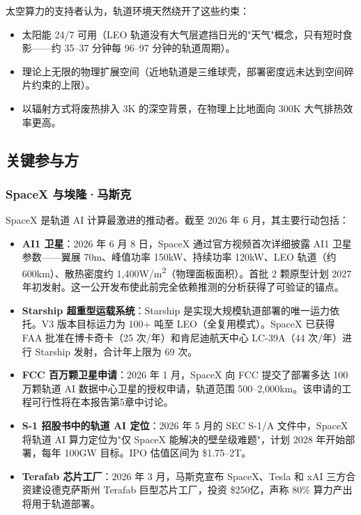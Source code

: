 太空算力的支持者认为，轨道环境天然绕开了这些约束：
\begin{itemize}[leftmargin=*]
    \item 太阳能 24/7 可用（LEO 轨道没有大气层遮挡日光的"天气"概念，只有短时食影——约 35--37 分钟每 96--97 分钟的轨道周期）。
    \item 理论上无限的物理扩展空间（近地轨道是三维球壳，部署密度远未达到空间碎片约束的上限）。
    \item 以辐射方式将废热排入 3\;K 的深空背景，在物理上比地面向 300\;K 大气排热效率更高。
\end{itemize}

\subsection{关键参与方}

\subsubsection{SpaceX 与埃隆·马斯克}

SpaceX 是轨道 AI 计算最激进的推动者。截至 2026 年 6 月，其主要行动包括：

\begin{itemize}[leftmargin=*]
    \item \textbf{AI1 卫星}：2026 年 6 月 8 日，SpaceX 通过官方视频首次详细披露 AI1 卫星参数——翼展 70\;m、峰值功率 150\;kW、持续功率 120\;kW、LEO 轨道（约 600\;km）、散热密度约 1,400\;W/m\textsuperscript{2}（物理面板面积）。首批 2 颗原型计划 2027 年初发射。这一公开发布使此前完全依赖推测的分析获得了可验证的锚点\cite{spacex2026ai1}。
    \item \textbf{Starship 超重型运载系统}：Starship 是实现大规模轨道部署的唯一运力依托。V3 版本目标运力为 100+ 吨至 LEO（全复用模式）。SpaceX 已获得 FAA 批准在博卡奇卡（25 次/年）和肯尼迪航天中心 LC-39A（44 次/年）进行 Starship 发射，合计年上限为 69 次\cite{faa2025boca,faa2026ksc}。
    \item \textbf{FCC 百万颗卫星申请}：2026 年 1 月，SpaceX 向 FCC 提交了部署多达 100 万颗轨道 AI 数据中心卫星的授权申请，轨道范围 500--2,000\;km。该申请的工程可行性将在本报告第5章中讨论\cite{spacex2026fcc}。
    \item \textbf{S-1 招股书中的轨道 AI 定位}：2026 年 5 月的 SEC S-1/A 文件中，SpaceX 将轨道 AI 算力定位为"仅 SpaceX 能解决的壁垒级难题"，计划 2028 年开始部署，每年 100\;GW 目标。IPO 估值区间为 \$1.75--2\;T\cite{spacex2026s1}。
    \item \textbf{Terafab 芯片工厂}：2026 年 3 月，马斯克宣布 SpaceX、Tesla 和 xAI 三方合资建设德克萨斯州 Terafab 巨型芯片工厂，投资 \$250\;亿，声称 80\% 算力产出将用于轨道部署\cite{musk2026terafab}。
\end{itemize}

